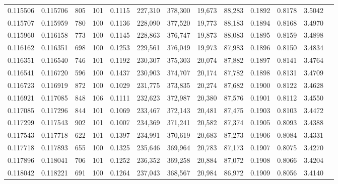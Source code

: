 \begin{tabular}{rrrrrrrrrrrrr}
0.115506 & 0.115706 &   805 & 101 &                                     0.1115 & 227,310 & 378,300 &  19,673 &  88,283 & 0.1892 & 0.8178 & 3.5042 \\
0.115707 & 0.115959 &   780 & 100 &                                     0.1136 & 228,090 & 377,520 &  19,773 &  88,183 & 0.1894 & 0.8168 & 3.4970 \\
0.115960 & 0.116158 &   773 & 100 &                                     0.1145 & 228,863 & 376,747 &  19,873 &  88,083 & 0.1895 & 0.8159 & 3.4898 \\
0.116162 & 0.116351 &   698 & 100 &                                     0.1253 & 229,561 & 376,049 &  19,973 &  87,983 & 0.1896 & 0.8150 & 3.4834 \\
0.116351 & 0.116540 &   746 & 101 &                                     0.1192 & 230,307 & 375,303 &  20,074 &  87,882 & 0.1897 & 0.8141 & 3.4764 \\
0.116541 & 0.116720 &   596 & 100 &                                     0.1437 & 230,903 & 374,707 &  20,174 &  87,782 & 0.1898 & 0.8131 & 3.4709 \\
0.116723 & 0.116919 &   872 & 100 &                                     0.1029 & 231,775 & 373,835 &  20,274 &  87,682 & 0.1900 & 0.8122 & 3.4628 \\
0.116921 & 0.117085 &   848 & 106 &                                     0.1111 & 232,623 & 372,987 &  20,380 &  87,576 & 0.1901 & 0.8112 & 3.4550 \\
0.117085 & 0.117296 &   844 & 101 &                                     0.1069 & 233,467 & 372,143 &  20,481 &  87,475 & 0.1903 & 0.8103 & 3.4472 \\
0.117299 & 0.117543 &   902 & 101 &                                     0.1007 & 234,369 & 371,241 &  20,582 &  87,374 & 0.1905 & 0.8093 & 3.4388 \\
0.117543 & 0.117718 &   622 & 101 &                                     0.1397 & 234,991 & 370,619 &  20,683 &  87,273 & 0.1906 & 0.8084 & 3.4331 \\
0.117718 & 0.117893 &   655 & 100 &                                     0.1325 & 235,646 & 369,964 &  20,783 &  87,173 & 0.1907 & 0.8075 & 3.4270 \\
0.117896 & 0.118041 &   706 & 101 &                                     0.1252 & 236,352 & 369,258 &  20,884 &  87,072 & 0.1908 & 0.8066 & 3.4204 \\
0.118042 & 0.118221 &   691 & 100 &                                     0.1264 & 237,043 & 368,567 &  20,984 &  86,972 & 0.1909 & 0.8056 & 3.4140 \\

\end{tabular}
